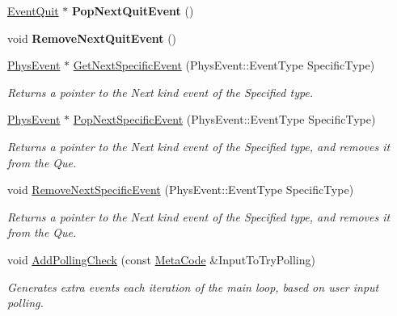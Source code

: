 \begin{DoxyCompactItemize}
\item 
\hypertarget{classPhysEventManager_a1def6dcacc5dd8a0d55dd2d47fe89a1c}{
\hyperlink{classphys_1_1EventQuit}{EventQuit} $\ast$ {\bfseries PopNextQuitEvent} ()}
\label{d5/dd7/classPhysEventManager_a1def6dcacc5dd8a0d55dd2d47fe89a1c}

\item 
\hypertarget{classPhysEventManager_accdd3b4047b05b721f77ca68e016baf5}{
void {\bfseries RemoveNextQuitEvent} ()}
\label{d5/dd7/classPhysEventManager_accdd3b4047b05b721f77ca68e016baf5}

\item 
\hyperlink{classPhysEvent}{PhysEvent} $\ast$ \hyperlink{classPhysEventManager_a56e45572c2fb84131f7d55c060c7ac21}{GetNextSpecificEvent} (PhysEvent::EventType SpecificType)
\begin{DoxyCompactList}\small\item\em Returns a pointer to the Next kind event of the Specified type. \item\end{DoxyCompactList}\item 
\hyperlink{classPhysEvent}{PhysEvent} $\ast$ \hyperlink{classPhysEventManager_abce156f7ad7ab145b8b05740b48e6073}{PopNextSpecificEvent} (PhysEvent::EventType SpecificType)
\begin{DoxyCompactList}\small\item\em Returns a pointer to the Next kind event of the Specified type, and removes it from the Que. \item\end{DoxyCompactList}\item 
void \hyperlink{classPhysEventManager_a2d0c21e369d16cd2de97eb4c69003323}{RemoveNextSpecificEvent} (PhysEvent::EventType SpecificType)
\begin{DoxyCompactList}\small\item\em Returns a pointer to the Next kind event of the Specified type, and removes it from the Que. \item\end{DoxyCompactList}\item 
void \hyperlink{classPhysEventManager_a1e99385441c5377a741561db581ef3ae}{AddPollingCheck} (const \hyperlink{classphys_1_1MetaCode}{MetaCode} \&InputToTryPolling)
\begin{DoxyCompactList}\small\item\em Generates extra events each iteration of the main loop, based on user input polling. \item\end{DoxyCompactList}\item 

\end{DoxyCompactItemize}
